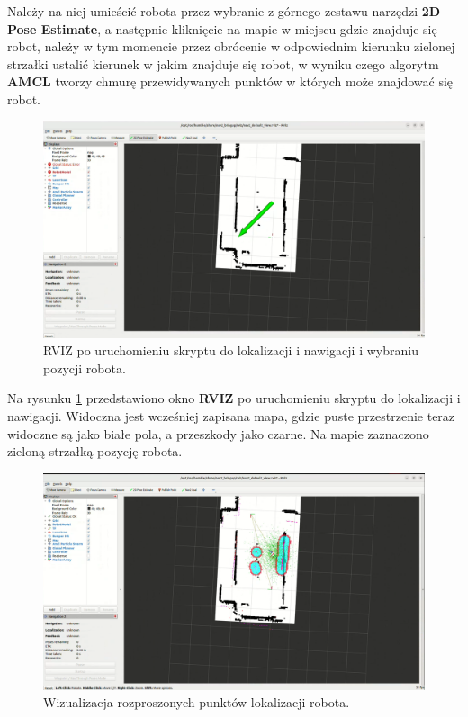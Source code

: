 \documentclass[a4paper,twoside,12pt]{book}
\begin{document}
Należy na niej umieścić robota przez wybranie z górnego zestawu narzędzi \textbf{2D Pose Estimate}, a następnie kliknięcie na mapie w miejscu gdzie znajduje się robot, należy w tym momencie przez obrócenie w odpowiednim kierunku zielonej strzałki ustalić kierunek w jakim znajduje się robot,
 w wyniku czego algorytm \textbf{AMCL} tworzy chmurę przewidywanych punktów w których może znajdować się robot.
\begin{figure}[!hb]
	\centering
	\includegraphics[width=1\textwidth]{images/launch-nav.png}
	\caption{RVIZ po uruchomieniu skryptu do lokalizacji i nawigacji i wybraniu pozycji robota.}
	\label{fig:nav-map}
\end{figure}
\newline
Na rysunku \ref{fig:nav-map} przedstawiono okno \textbf{RVIZ} po uruchomieniu skryptu do lokalizacji i nawigacji. Widoczna jest wcześniej zapisana mapa, gdzie puste przestrzenie teraz widoczne są jako białe pola, a przeszkody jako czarne. Na mapie zaznaczono zieloną strzałką pozycję robota.
\newpage
\begin{figure}[!hb]
	\centering
	\includegraphics[width=1\textwidth]{images/launch-nav2.png}
	\caption{Wizualizacja rozproszonych punktów lokalizacji robota.}
	\label{fig:nav-map2}
\end{figure}
\end{document}
